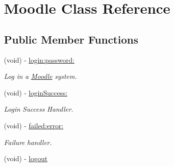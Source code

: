 \hypertarget{interface_moodle}{
\section{Moodle Class Reference}
\label{interface_moodle}
}
\subsection*{Public Member Functions}
\begin{DoxyCompactItemize}
\item 
(void) -\/ \hyperlink{interface_moodle_a9213ffaec574e053426c7889c096ab3d}{login:password:}
\begin{DoxyCompactList}\small\item\em Log in a \hyperlink{interface_moodle}{Moodle} system. \item\end{DoxyCompactList}\item 
\hypertarget{interface_moodle_a5781c50f886a420b8e7d8b9cf824f68c}{
(void) -\/ \hyperlink{interface_moodle_a5781c50f886a420b8e7d8b9cf824f68c}{loginSuccess:}}
\label{interface_moodle_a5781c50f886a420b8e7d8b9cf824f68c}

\begin{DoxyCompactList}\small\item\em Login Success Handler. \item\end{DoxyCompactList}\item 
\hypertarget{interface_moodle_aa0c8c98374d884a787a8a212f375120a}{
(void) -\/ \hyperlink{interface_moodle_aa0c8c98374d884a787a8a212f375120a}{failed:error:}}
\label{interface_moodle_aa0c8c98374d884a787a8a212f375120a}

\begin{DoxyCompactList}\small\item\em Failure handler. \item\end{DoxyCompactList}\item 
\hypertarget{interface_moodle_a15ea5da83295031cf3384ce7b13ca570}{
(void) -\/ \hyperlink{interface_moodle_a15ea5da83295031cf3384ce7b13ca570}{logout}}
\label{interface_moodle_a15ea5da83295031cf3384ce7b13ca570}


\end{DoxyCompactItemize}
